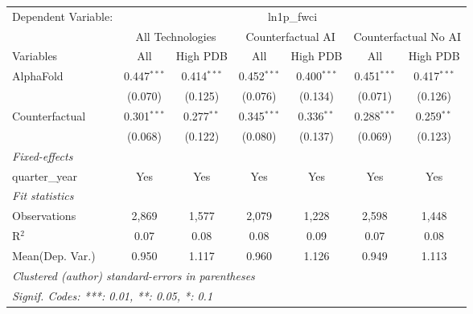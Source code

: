 \begingroup
\centering
\begin{tabular}{lcccccc}
   \tabularnewline \midrule \midrule
   Dependent Variable: & \multicolumn{6}{c}{ln1p\_fwci}\\
 & \multicolumn{2}{c}{All Technologies} & \multicolumn{2}{c}{Counterfactual AI} & \multicolumn{2}{c}{Counterfactual No AI} \\
\cmidrule(lr){1-1}\cmidrule(lr){2-3} \cmidrule(lr){4-5} \cmidrule(lr){6-7}
Variables & \multicolumn{1}{c}{All} & \multicolumn{1}{c}{High PDB} & \multicolumn{1}{c}{All} & \multicolumn{1}{c}{High PDB} & \multicolumn{1}{c}{All} & \multicolumn{1}{c}{High PDB} \\
\cmidrule(lr){1-1}\cmidrule(lr){2-2} \cmidrule(lr){3-3} \cmidrule(lr){4-4} \cmidrule(lr){5-5} \cmidrule(lr){6-6} \cmidrule(lr){7-7}
   AlphaFold      & 0.447$^{***}$ & 0.414$^{***}$ & 0.452$^{***}$ & 0.400$^{***}$ & 0.451$^{***}$ & 0.417$^{***}$\\   
                  & (0.070)       & (0.125)       & (0.076)       & (0.134)       & (0.071)       & (0.126)\\   
   Counterfactual & 0.301$^{***}$ & 0.277$^{**}$  & 0.345$^{***}$ & 0.336$^{**}$  & 0.288$^{***}$ & 0.259$^{**}$\\   
                  & (0.068)       & (0.122)       & (0.080)       & (0.137)       & (0.069)       & (0.123)\\   
   \midrule
   \emph{Fixed-effects}\\
   quarter\_year  & Yes           & Yes           & Yes           & Yes           & Yes           & Yes\\  
   \midrule
   \emph{Fit statistics}\\
   Observations   & 2,869         & 1,577         & 2,079         & 1,228         & 2,598         & 1,448\\  
   R$^2$          & 0.07          & 0.08          & 0.08          & 0.09          & 0.07          & 0.08\\  
Mean(Dep. Var.) & 0.950 & 1.117 & 0.960 & 1.126 & 0.949 & 1.113 \\
   \midrule \midrule
   \multicolumn{7}{l}{\emph{Clustered (author) standard-errors in parentheses}}\\
   \multicolumn{7}{l}{\emph{Signif. Codes: ***: 0.01, **: 0.05, *: 0.1}}\\
\end{tabular}
\par\endgroup
